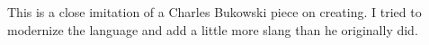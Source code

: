 This is a close imitation of a Charles Bukowski piece on creating. I tried to modernize the language and add a little more slang than he originally did.

